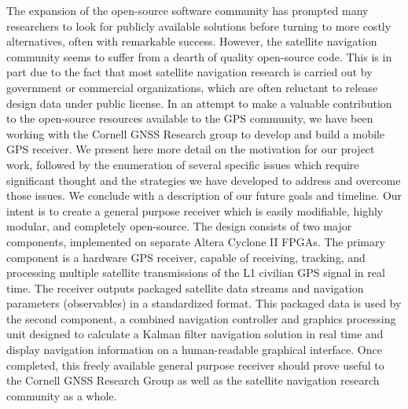 \documentclass[14pt]{article}
\begin{document}
The expansion of the open-source software community has prompted many researchers to look for publicly
available solutions before turning to more costly alternatives, often with remarkable success.  However,
the satellite navigation community seems to suffer from a dearth of quality open-source code.  This is
in part due to the fact that most satellite navigation research is carried out by government or
commercial organizations, which are often reluctant to release design data under public license.  In an
attempt to make a valuable contribution to the open-source resources available to the GPS community, we
have been working with the Cornell GNSS Research group to develop and build a mobile GPS receiver.    
We present here more detail on the motivation for our project work, followed by the enumeration of
several specific issues which require significant thought and the strategies we have developed to
address and overcome those issues.  We conclude with a description of our future goals and timeline.  
Our intent is to create a general purpose receiver which is easily modifiable, 
highly modular, and completely open-source.  The design consists of two major components, 
implemented on separate Altera Cyclone II FPGAs.  The primary component is a hardware GPS receiver, 
capable of receiving, tracking, and processing multiple satellite transmissions of the L1 civilian GPS
signal in real time.  The receiver outputs packaged satellite data streams and navigation parameters
(observables) in a standardized format.  This packaged data is used by the second component, a
combined navigation controller and graphics processing unit designed to calculate a Kalman filter
navigation solution in real time and display navigation information on a human-readable graphical
interface.  Once completed, this freely available general purpose receiver should prove useful to 
the Cornell GNSS Research Group as well as the satellite navigation research community as a whole.
\end{document}
